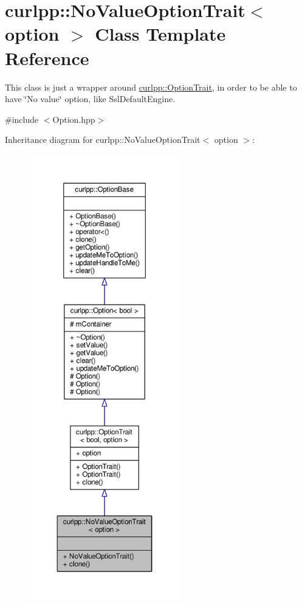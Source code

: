 \hypertarget{classcurlpp_1_1NoValueOptionTrait}{\section{curlpp\-:\-:No\-Value\-Option\-Trait$<$ option $>$ Class Template Reference}
\label{classcurlpp_1_1NoValueOptionTrait}
}


This class is just a wrapper around \hyperlink{classcurlpp_1_1OptionTrait}{curlpp\-::\-Option\-Trait}, in order to be able to have \char`\"{}\-No value\char`\"{} option, like Ssl\-Default\-Engine.  




{\ttfamily \#include $<$Option.\-hpp$>$}



Inheritance diagram for curlpp\-:\-:No\-Value\-Option\-Trait$<$ option $>$\-:
\nopagebreak
\begin{figure}[H]
\begin{center}
\leavevmode
\includegraphics[height=550pt]{classcurlpp_1_1NoValueOptionTrait__inherit__graph}
\end{center}
\end{figure}


